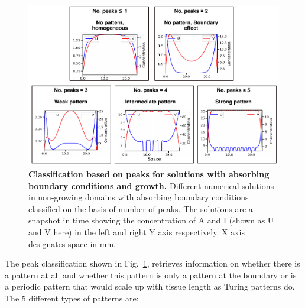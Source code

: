 \begin{figure}[H] %
    \centering
    \begin{adjustbox}{center}
        \includegraphics[width=1\textwidth]{chapters/Chapter 1/peaks_classification} %
    \end{adjustbox}
    \caption{\textbf{Classification based on peaks for solutions with absorbing boundary conditions and growth.} Different numerical solutions in non-growing domains with absorbing boundary conditions classified on the basis of number of peaks. The solutions are a snapshot in time showing the concentration of A and I (shown as U and V here) in the left and right Y axis respectively. X axis designates space in mm.}
    \label{fig:peaks_classification} %
\end{figure}
The peak classification shown in Fig.~\ref{fig:peaks_classification}, retrieves information on whether there is a pattern at all and whether this pattern is only a pattern at the boundary or is a periodic pattern that would scale up with tissue length as Turing patterns do.
The 5 different types of patterns are:
